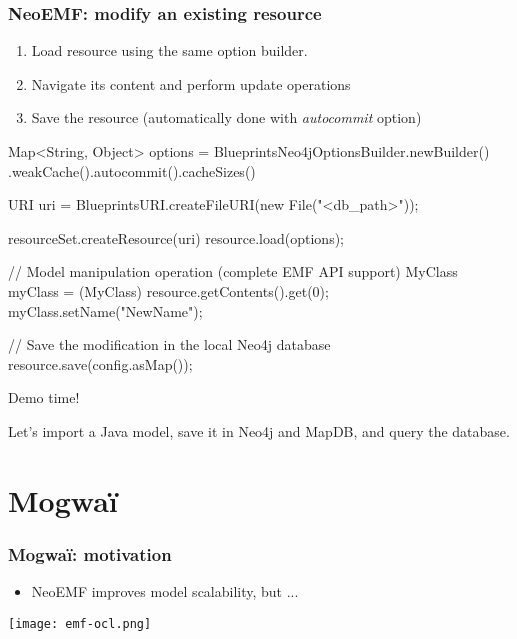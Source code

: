 \begin{frame}[fragile]\frametitle{NeoEMF: modify an existing resource}
	\begin{enumerate}
	\item Load resource using the same option builder.
	\item Navigate its content and perform update operations
	\item Save the resource (automatically done with \emph{autocommit} option)
	\end{enumerate}
	
  \begin{java}
Map<String, Object> options = BlueprintsNeo4jOptionsBuilder.newBuilder()
		.weakCache().autocommit().cacheSizes()

URI uri = BlueprintsURI.createFileURI(new File("<db_path>"));

resourceSet.createResource(uri)
resource.load(options);

// Model manipulation operation (complete EMF API support)
MyClass myClass = (MyClass) resource.getContents().get(0);
myClass.setName("NewName");

// Save the modification in the local Neo4j database
resource.save(config.asMap());
  \end{java}
\end{frame}

\begin{frame}[standout]
  Demo time!

  Let's import a Java model, save it in Neo4j and MapDB, and query the database.
\end{frame}

\section{Mogwa\"i}

\begin{frame}[c]\frametitle{Mogwa\"i: motivation}
	\begin{itemize}
		\item NeoEMF improves model scalability, but ...
	\end{itemize}
  \begin{center}
    \texttt{[image: emf-ocl.png]}
  \end{center}
\end{frame}

